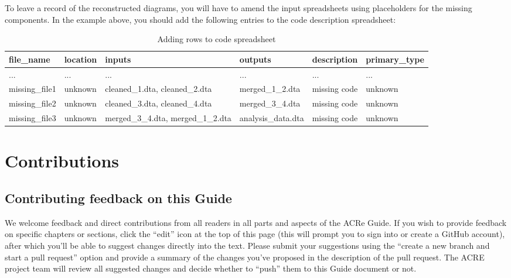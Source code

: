 \documentclass[
]{book}
\begin{document}
To leave a record of the reconstructed diagrams, you will have to amend the input spreadsheets using placeholders for the missing components. In the example above, you should add the following entries to the code description spreadsheet:

\begin{table}

\caption{\label{tab:adding-rows-extra}Adding rows to code spreadsheet}
\centering
\begin{tabu} to 
\hline
file\_name & location & inputs & outputs & description & primary\_type\\
\hline
... & ... & ... & ... & ... & ...\\
\hline
missing\_file1 & unknown & cleaned\_1.dta, cleaned\_2.dta & merged\_1\_2.dta & missing code & unknown\\
\hline
missing\_file2 & unknown & cleaned\_3.dta, cleaned\_4.dta & merged\_3\_4.dta & missing code & unknown\\
\hline
missing\_file3 & unknown & merged\_3\_4.dta, merged\_1\_2.dta & analysis\_data.dta & missing code & unknown\\
\hline
\end{tabu}
\end{table}

\hypertarget{contributions}{%
\chapter{Contributions}\label{contributions}}

\hypertarget{contrib-guide}{%
\section{Contributing feedback on this Guide}\label{contrib-guide}}

We welcome feedback and direct contributions from all readers in all parts and aspects of the ACRe Guide. If you wish to provide feedback on specific chapters or sections, click the ``edit'' icon at the top of this page (this will prompt you to sign into or create a GitHub account), after which you'll be able to suggest changes directly into the text. Please submit your suggestions using the ``create a new branch and start a pull request'' option and provide a summary of the changes you've proposed in the description of the pull request. The ACRE project team will review all suggested changes and decide whether to ``push'' them to this Guide document or not.
\end{document}
